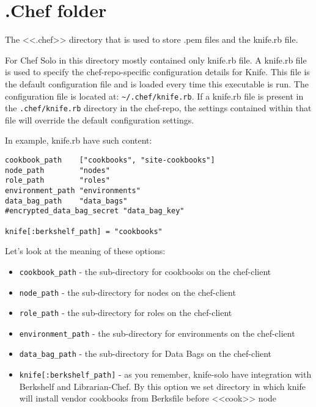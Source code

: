 \section{.Chef folder}
\label{sec:solo-chef-folder}

The <<.chef>> directory that is used to store .pem files and the knife.rb file.

For Chef Solo in this directory mostly contained only knife.rb file. A knife.rb file is used to specify the chef-repo-specific configuration details for Knife. This file is the default configuration file and is loaded every time this executable is run. The configuration file is located at: \lstinline!~/.chef/knife.rb!. If a knife.rb file is present in the \lstinline!.chef/knife.rb! directory in the chef-repo, the settings contained within that file will override the default configuration settings.

In example, knife.rb have such content:

\begin{lstlisting}[label=lst:my-cloud-chef-folder1,title=my-cloud/.chef/knife.rb]
cookbook_path    ["cookbooks", "site-cookbooks"]
node_path        "nodes"
role_path        "roles"
environment_path "environments"
data_bag_path    "data_bags"
#encrypted_data_bag_secret "data_bag_key"

knife[:berkshelf_path] = "cookbooks"
\end{lstlisting}

Let's look at the meaning of these options:

\begin{itemize}
  \item \lstinline!cookbook_path! - the sub-directory for cookbooks on the chef-client
  \item \lstinline!node_path! - the sub-directory for nodes on the chef-client
  \item \lstinline!role_path! - the sub-directory for roles on the chef-client
  \item \lstinline!environment_path! - the sub-directory for environments on the chef-client
  \item \lstinline!data_bag_path! - the sub-directory for Data Bags on the chef-client
  \item \lstinline!knife[:berkshelf_path]! - as you remember, knife-solo have integration with Berkshelf and Librarian-Chef. By this option we set directory in which knife will install vendor cookbooks from Berksfile before <<cook>> node
\end{itemize}
